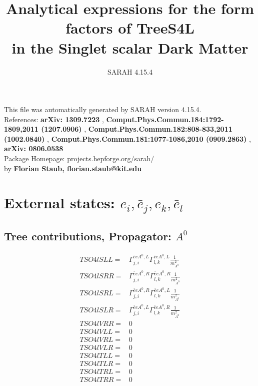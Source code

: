 \documentclass[A4,landscape]{article}
\begin{document}
\title{Analytical expressions for the form factors of TreeS4L\\ in the Singlet scalar Dark Matter } 
 \author{SARAH 4.15.4} 
 \maketitle 
 \vspace{10cm} 
This file was automatically generated by SARAH version 4.15.4.  \\ 
References: {\bf arXiv: 1309.7223 }, {\bf Comput.Phys.Commun.184:1792-1809,2011 (1207.0906) }, {\bf Comput.Phys.Commun.182:808-833,2011 (1002.0840) }, {\bf Comput.Phys.Commun.181:1077-1086,2010 (0909.2863) }, {\bf arXiv: 0806.0538 } \\ 
Package Homepage: projects.hepforge.org/sarah/ \\ 
by {\bf Florian Staub, florian.staub@kit.edu} 
 \pagebreak 
 \tableofcontents 
 \pagebreak 
\section{External states: ${e_{{i}}, \bar{e}_{{j}}, e_{{k}}, \bar{e}_{{l}}}$} 
\subsection{Tree contributions, Propagator: $A^0$} 

\begin{align} 
  TSO4lSLL= & \Gamma^{\bar{e}e A^0 ,L}_{j, i} \Gamma^{\bar{e}e A^0 ,L}_{l, k} \frac{1}{m^2_{A^0}} \\ 
  TSO4lSRR= & \Gamma^{\bar{e}e A^0 ,R}_{j, i} \Gamma^{\bar{e}e A^0 ,R}_{l, k} \frac{1}{m^2_{A^0}} \\ 
  TSO4lSRL= & \Gamma^{\bar{e}e A^0 ,R}_{j, i} \Gamma^{\bar{e}e A^0 ,L}_{l, k} \frac{1}{m^2_{A^0}} \\ 
  TSO4lSLR= & \Gamma^{\bar{e}e A^0 ,L}_{j, i} \Gamma^{\bar{e}e A^0 ,R}_{l, k} \frac{1}{m^2_{A^0}} \\ 
  TSO4lVRR= & 0 \\ 
  TSO4lVLL= & 0 \\ 
  TSO4lVRL= & 0 \\ 
  TSO4lVLR= & 0 \\ 
  TSO4lTLL= & 0 \\ 
  TSO4lTLR= & 0 \\ 
  TSO4lTRL= & 0 \\ 
  TSO4lTRR= & 0 \\ 
\end{align} 
\end{document}
